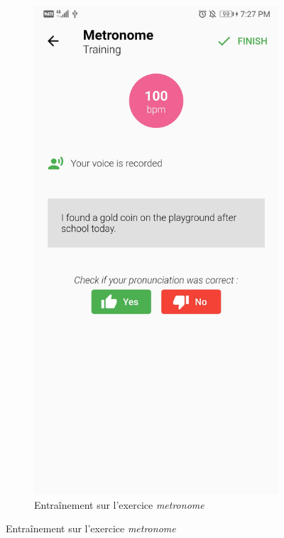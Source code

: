 \begin{appendices}
\begin{landscape}
\begin{figure}[h]
\begin{subfigure}{.25\textwidth}
    \includegraphics[width=.75\linewidth]{content/imgs/screen4.jpg}
    \caption{Entraînement sur l'exercice \textit{metronome}}
    \label{appendix:screen_metronome_train}
  \end{subfigure}
\end{figure}



\end{landscape}
\end{appendices}
